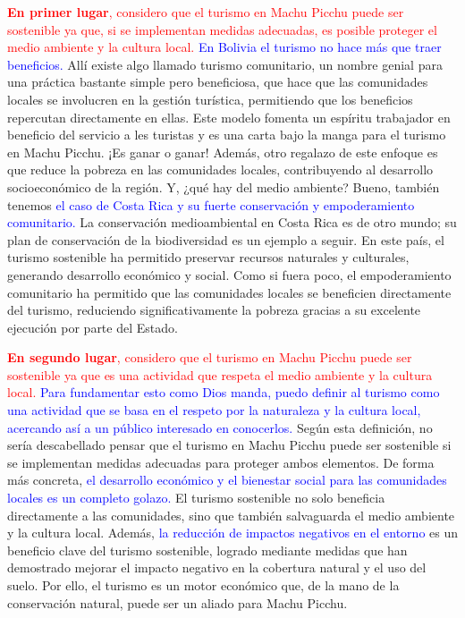 \documentclass{article}
\begin{document}
\textcolor{red}{\textbf{En primer lugar}, considero que el turismo en Machu Picchu puede ser sostenible ya que, si se implementan medidas adecuadas, es posible proteger el medio ambiente y la cultura local.} \textcolor{blue}{En Bolivia el turismo no hace más que traer beneficios.} Allí existe algo llamado turismo comunitario, un nombre genial para una práctica bastante simple pero beneficiosa, que hace que las comunidades locales se involucren en la gestión turística, permitiendo que los beneficios repercutan directamente en ellas. Este modelo fomenta un espíritu trabajador en beneficio del servicio a les turistas y es una carta bajo la manga para el turismo en Machu Picchu. ¡Es ganar o ganar! Además, otro regalazo de este enfoque es que reduce la pobreza en las comunidades locales, contribuyendo al desarrollo socioeconómico de la región. Y, ¿qué hay del medio ambiente? Bueno, también tenemos \textcolor{blue}{el caso de Costa Rica y su fuerte conservación y empoderamiento comunitario.} La conservación medioambiental en Costa Rica es de otro mundo; su plan de conservación de la biodiversidad es un ejemplo a seguir. En este país, el turismo sostenible ha permitido preservar recursos naturales y culturales, generando desarrollo económico y social. Como si fuera poco, el empoderamiento comunitario ha permitido que las comunidades locales se beneficien directamente del turismo, reduciendo significativamente la pobreza gracias a su excelente ejecución por parte del Estado.

\textcolor{red}{\textbf{En segundo lugar}, considero que el turismo en Machu Picchu puede ser sostenible ya que es una actividad que respeta el medio ambiente y la cultura local.} \textcolor{blue}{Para fundamentar esto como Dios manda, puedo definir al turismo como una actividad que se basa en el respeto por la naturaleza y la cultura local, acercando así a un público interesado en conocerlos.} Según esta definición, no sería descabellado pensar que el turismo en Machu Picchu puede ser sostenible si se implementan medidas adecuadas para proteger ambos elementos. De forma más concreta, \textcolor{blue}{el desarrollo económico y el bienestar social para las comunidades locales es un completo golazo.} El turismo sostenible no solo beneficia directamente a las comunidades, sino que también salvaguarda el medio ambiente y la cultura local. Además, \textcolor{blue}{la reducción de impactos negativos en el entorno} es un beneficio clave del turismo sostenible, logrado mediante medidas que han demostrado mejorar el impacto negativo en la cobertura natural y el uso del suelo. Por ello, el turismo es un motor económico que, de la mano de la conservación natural, puede ser un aliado para Machu Picchu.
\end{document}
